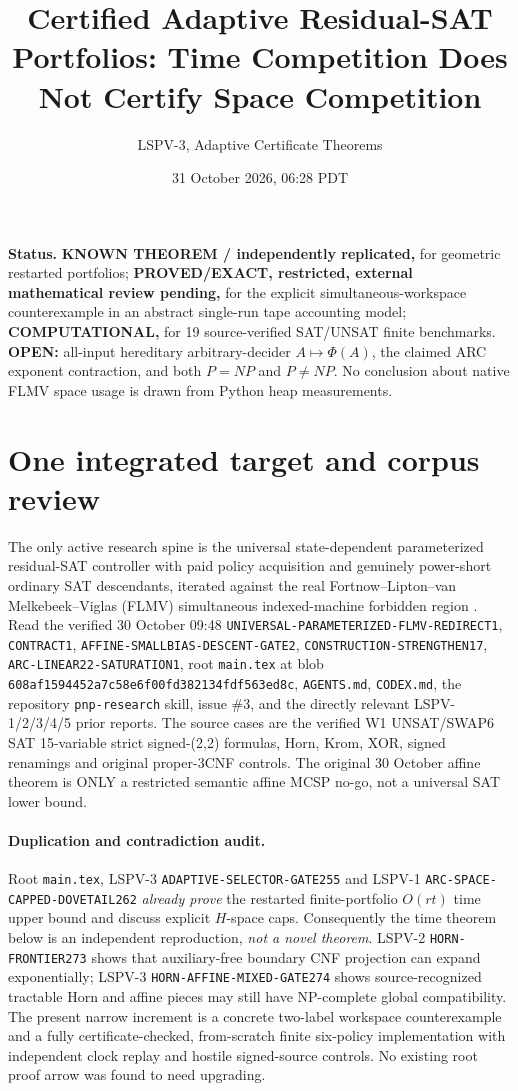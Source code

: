 \documentclass[11pt]{article}
\title{Certified Adaptive Residual-SAT Portfolios: Time Competition Does Not Certify Space Competition}
\author{LSPV-3, Adaptive Certificate Theorems}
\date{31 October 2026, 06:28 PDT}
\begin{document}
\maketitle
\noindent\textbf{Status.} \textbf{KNOWN THEOREM / independently replicated,} for geometric restarted portfolios; \textbf{PROVED/EXACT, restricted, external mathematical review pending,} for the explicit simultaneous-workspace counterexample in an abstract single-run tape accounting model; \textbf{COMPUTATIONAL,} for 19 source-verified SAT/UNSAT finite benchmarks. \textbf{OPEN:} all-input hereditary arbitrary-decider $A\mapsto\Phi(A)$, the claimed ARC exponent contraction, and both $P=NP$ and $P\ne NP$. No conclusion about native FLMV space usage is drawn from Python heap measurements.

\section{One integrated target and corpus review}
The only active research spine is the universal state-dependent parameterized residual-SAT controller with paid policy acquisition and genuinely power-short ordinary SAT descendants, iterated against the real Fortnow--Lipton--van Melkebeek--Viglas (FLMV) simultaneous indexed-machine forbidden region \cite{flmv}. Read the verified 30 October 09:48 \texttt{UNIVERSAL-PARAMETERIZED-FLMV-REDIRECT1}, \texttt{CONTRACT1}, \texttt{AFFINE-SMALLBIAS-DESCENT-GATE2}, \texttt{CONSTRUCTION-STRENGTHEN17}, \texttt{ARC-LINEAR22-SATURATION1}, root \texttt{main.tex} at blob \texttt{608af1594452a7c58e6f00fd382134fdf563ed8c}, \texttt{AGENTS.md}, \texttt{CODEX.md}, the repository \texttt{pnp-research} skill, issue \#3, and the directly relevant LSPV-1/2/3/4/5 prior reports. The source cases are the verified W1 UNSAT/SWAP6 SAT 15-variable strict signed-(2,2) formulas, Horn, Krom, XOR, signed renamings and original proper-3CNF controls. The original 30 October affine theorem is ONLY a restricted semantic affine MCSP no-go, not a universal SAT lower bound.

\paragraph{Duplication and contradiction audit.} Root \texttt{main.tex}, LSPV-3 \texttt{ADAPTIVE-SELECTOR-GATE255} and LSPV-1 \texttt{ARC-SPACE-CAPPED-DOVETAIL262} \emph{already prove} the restarted finite-portfolio $O(rt)$ time upper bound and discuss explicit $H$-space caps. Consequently the time theorem below is an independent reproduction, \emph{not a novel theorem}. LSPV-2 \texttt{HORN-FRONTIER273} shows that auxiliary-free boundary CNF projection can expand exponentially; LSPV-3 \texttt{HORN-AFFINE-MIXED-GATE274} shows source-recognized tractable Horn and affine pieces may still have NP-complete global compatibility. The present narrow increment is a concrete two-label workspace counterexample and a fully certificate-checked, from-scratch finite six-policy implementation with independent clock replay and hostile signed-source controls. No existing root proof arrow was found to need upgrading.
\end{document}
